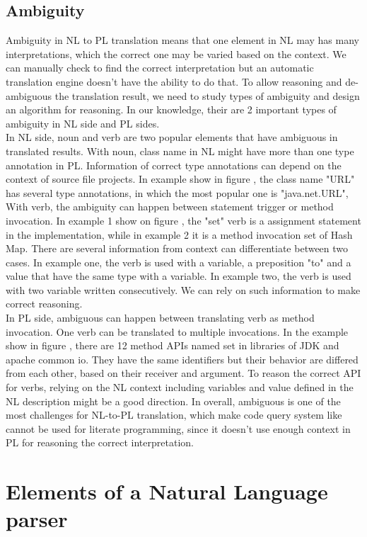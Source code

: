 \subsection{Ambiguity}
Ambiguity in NL to PL translation means that one element in NL may has many interpretations, which the correct one may be varied based on the context. We can manually check to find the correct interpretation but an automatic translation engine doesn't have the ability to do that. To allow reasoning and de-ambiguous the translation result, we need to study types of ambiguity and design an algorithm for reasoning. In our knowledge, their are 2 important types of ambiguity in NL side and PL sides. \\
In NL side, noun and verb are two popular elements that have ambiguous in translated results. With noun, class name in NL might have more than one type annotation in PL. Information of correct type annotations can depend on the context of source file projects. In example show in figure \cite{}, the class name "URL" has several type annotations, in which the most popular one is "java.net.URL", With verb, the ambiguity can happen between statement trigger or method invocation. In example 1 show on figure \cite{}, the "set" verb is a assignment statement in the implementation, while in example 2 it is a method invocation set of Hash Map. There are several information from context can differentiate between two cases. In example one, the verb is used with a variable, a preposition "to" and a value that have the same type with a variable. In example two, the verb is used with two variable written consecutively. We can rely on such information to make correct reasoning.  \\
In PL side, ambiguous can happen between translating verb as method invocation. One verb can be translated to multiple invocations. In the example show in figure \cite{}, there are 12 method APIs named set in libraries of JDK and apache common io. They have the same identifiers but their behavior are differed from each other, based on their receiver and argument. To reason the correct API for verbs, relying on the NL context including variables and value defined in the NL description might be a good direction. In overall, ambiguous is one of the most challenges for NL-to-PL translation, which make code query system like \cite{} cannot be used for literate programming, since it doesn't use enough context in PL for reasoning the correct interpretation. 
     
\section{Elements  of a Natural Language parser}

